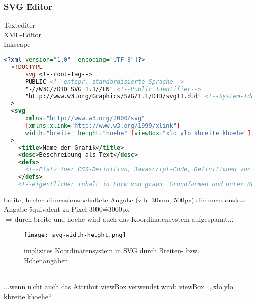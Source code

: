 \subsubsection{SVG Editor}
Texteditor\\
XML-Editor\\
Inkscape\\
\begin{lstlisting}[caption={Grundgerüst einer SVG-Datei}, label={lst:Grundger:SVG}, language={XML}]
  <?xml version="1.0" [encoding="UTF-8"]?>
  <!DOCTYPE 
      svg <!--root-Tag-->
      PUBLIC <!--entspr. standardisierte Sprache-->
      "-//W3C//DTD SVG 1.1//EN" <!--Public Identifier-->
      "http://www.w3.org/Graphics/SVG/1.1/DTD/svg11.dtd" <!--System-Identifier-->
  >
  <svg
      xmlns="http://www.w3.org/2000/svg"
      [xmlns:xlink="http://www.w3.org/1999/xlink"]
      width="breite" height="hoehe" [viewBox="xlo ylo kbreite khoehe"]
  >
    <title>Name der Grafik</title>
    <desc>Beschreibung als Text</desc>
    <defs>
      <!--Platz fuer CSS-Definition, Javascript-Code, Definitionen von graph Objekten, welche zunaechst nicht angezeigt werden-->
    </defs>
    <!--eigentlicher Inhalt in Form von graph. Grundformen und unter Benutzung von komplexen (auch ind <defs> definierten) graph. Objekten-->
\end{lstlisting}
breite, hoehe: dimensionsbehaftete Angabe (z.b. 30mm, 500px) dimmensionslose Angabe äquivalent zu Pixel 3000\^=3000px\\
$\Rightarrow$durch breite und hoehe wird auch das Koordinatensystem aufgespannt...
\begin{figure}[h]
  \centering
  \texttt{[image: svg-width-height.png]}
  \caption{implizites Koordinatensystem in SVG durch Breiten- bzw. Höhenangaben}
\end{figure}\\
...wenn nicht auch das Attribut viewBox verwendet wird: viewBox=„xlo ylo kbreite khoehe“

